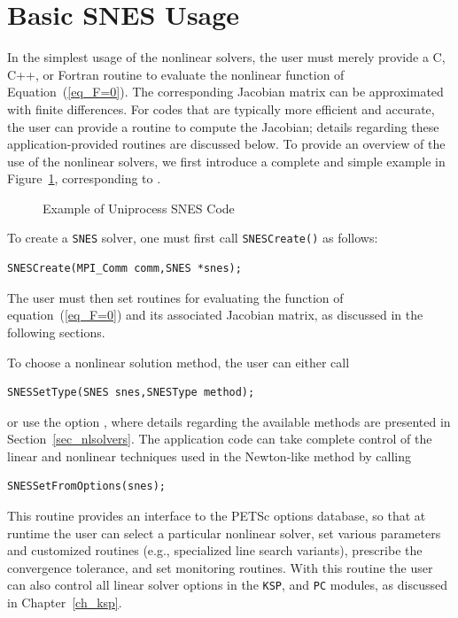 \section{Basic SNES Usage}
\label{sec_snesusage}

In the simplest usage of the nonlinear solvers, the user must merely
provide a C, C++, or Fortran routine to evaluate the nonlinear function
of Equation~(\ref{eq_F=0}).
The corresponding Jacobian  matrix
can be approximated with finite differences.
For codes that are typically more efficient and accurate, the
user can provide a routine to compute the Jacobian; details regarding these application-provided
routines are discussed below.
To provide an overview of the use of the nonlinear solvers,
we first introduce a complete and simple example in
Figure~\ref{fig_snesexample}, corresponding to
\href{https://www.mcs.anl.gov/petsc/petsc-current/src/snes/examples/tutorials/ex1.c.html}{}.

\begin{figure}[H]
  
\caption{Example of Uniprocess SNES Code}
\label{fig_snesexample}
\end{figure}

To create a \lstinline{SNES} solver, one must first call \lstinline{SNESCreate()} as follows:
\begin{lstlisting}
SNESCreate(MPI_Comm comm,SNES *snes);
\end{lstlisting}
The user must then set
routines for evaluating the function of equation~(\ref{eq_F=0}) and its
associated Jacobian matrix, as discussed in the following sections.

To choose a nonlinear solution method, the user can either
call
\begin{lstlisting}
SNESSetType(SNES snes,SNESType method);
\end{lstlisting}
or use the option , 
where details regarding the available methods are presented in
Section~\ref{sec_nlsolvers}.
The application code can take complete control of the linear and
nonlinear techniques used in the Newton-like method by calling
\begin{lstlisting}
SNESSetFromOptions(snes);
\end{lstlisting}
This routine provides an interface to the PETSc options database, so
that at runtime the user can select a particular nonlinear solver, set
various parameters and customized routines (e.g., specialized line
search variants), prescribe the convergence tolerance, and set
monitoring routines.  With this routine the user can also control all
linear solver options in the \lstinline{KSP}, and \lstinline{PC} modules, as discussed
in Chapter~\ref{ch_ksp}.


